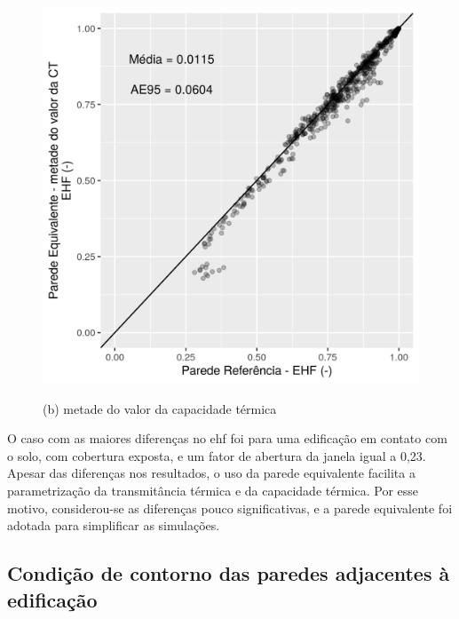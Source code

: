 \documentclass[brazil,hardcopy,openany]{ufscthesis} %
\begin{document}
\begin{figure}[h]
\begin{minipage}{.5\textwidth}
		\includegraphics[width=\linewidth]{img/paredeeq_EHF_par2b_scatter.png}
		\begin{center}
			\small{(b) metade do valor da capacidade térmica}\\
		\end{center}
	\end{minipage}
	\label{fig:par2_scatter}
\end{figure}

O caso com as maiores diferenças no \acrshort{ehf} foi para uma edificação em contato com o solo, com cobertura exposta, e um fator de abertura da janela igual a 0,23.
Apesar das diferenças nos resultados, o uso da parede equivalente facilita a parametrização da transmitância térmica e da capacidade térmica. Por esse motivo, considerou-se as diferenças pouco significativas, e a parede equivalente foi adotada para simplificar as simulações.

\subsection{Condição de contorno das paredes adjacentes à edificação}
\end{document}
